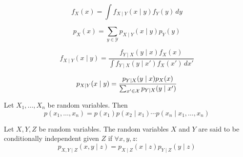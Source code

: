 \begin{ctheorem*} \vspace{-5pt}
  \[f_X(x) = \int f_{X \mid Y}(x \mid y) f_Y(y) \, dy\]
\end{ctheorem*}

\begin{dtheorem*} \vspace{-5pt}
  \[p_X(x) = \sum_{y \in \mathcal{Y}} p_{X \mid Y}(x \mid y)p_Y(y)\]
\end{dtheorem*}

\begin{ctheorem*} \vspace{-5pt}
  \[f_{X \mid Y}(x \mid y) = \frac{f_{Y \mid X}(y \mid x) f_X(x)}{\int f_{Y \mid X}(y \mid x') f_X(x') \, dx'}\]
\end{ctheorem*}

\begin{dtheorem*} \vspace{-5pt}
  \[p_{X \mid Y}(x \mid y) = \frac{p_{Y \mid X}(y \mid x) p_X(x)}{\sum_{x' \in \operatorname{\mathcal{X}}} p_{Y \mid X}(y \mid x')}\]
\end{dtheorem*}

\begin{theorem*}
  Let \(X_1, \ldots, X_n\) be random variables. Then
  \[p(x_1, \ldots, x_n) = p(x_1) p(x_2 \mid x_1) \cdots p(x_n \mid x_1, \ldots, x_n)\]
\end{theorem*}

\begin{theorem*}
  Let \(X, Y, Z\) be random variables. The random variables \(X\) and \(Y\) are said to be conditionally independent given \(Z\) if \(\forall x, y, z\):
  \[p_{X, Y \mid Z}(x, y \mid z) = p_{X \mid Z}(x \mid z) p_{Y \mid Z}(y \mid z)\]
\end{theorem*}
